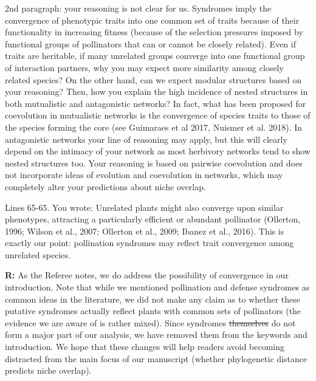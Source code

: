 \documentclass[12pt]{letter}
\newenvironment{refquote}{\bigskip \begin{it}}{\end{it}\smallskip}
\providecommand{\DIFdel}[1]{{\protect\color{red}\sout{#1}}}                      %
\providecommand{\DIFdelbegin}{} %
\providecommand{\DIFdelend}{} %
\newcommand{\DIFscaledelfig}{0.5}
\newlength{\DIFdelgraphicswidth} %
\newlength{\DIFdelgraphicsheight} %
\newcommand{\DIFdelincludegraphics}[2][]{%
\sbox{\DIFdelgraphicsbox}{\DIFOincludegraphics[#1]{#2}}%
\settoboxwidth{\DIFdelgraphicswidth}{\DIFdelgraphicsbox} %
\settoboxtotalheight{\DIFdelgraphicsheight}{\DIFdelgraphicsbox} %
\scalebox{\DIFscaledelfig}{%
\parbox[b]{\DIFdelgraphicswidth}{\usebox{\DIFdelgraphicsbox}\\[-\baselineskip] \rule{\DIFdelgraphicswidth}{0em}}\llap{\resizebox{\DIFdelgraphicswidth}{\DIFdelgraphicsheight}{%
\setlength{\unitlength}{\DIFdelgraphicswidth}%
\begin{picture}(1,1)%
\thicklines\linethickness{2pt} %
{\color[rgb]{1,0,0}\put(0,0){\framebox(1,1){}}}%
{\color[rgb]{1,0,0}\put(0,0){\line( 1,1){1}}}%
{\color[rgb]{1,0,0}\put(0,1){\line(1,-1){1}}}%
\end{picture}%
}\hspace*{3pt}}} %
} %
\DeclareRobustCommand{\DIFdelbegin}{\DIFOdelbegin \let\includegraphics\DIFdelincludegraphics} %
\DeclareRobustCommand{\DIFdelend}{\DIFOaddend \let\includegraphics\DIFOincludegraphics} %
\begin{document}
		\begin{refquote}
			2nd paragraph: your reasoning is not clear for us. Syndromes imply the convergence of phenotypic traits into one common set of traits because of their functionality in increasing fitness (because of the selection pressures imposed by functional groups of pollinators that can or cannot be closely related). Even if traits are heritable, if many unrelated groups converge into one functional group of interaction partners, why you may expect more similarity among closely related species? On the other hand, can we expect modular structures based on your reasoning? Then, how you explain the high incidence of nested structures in both mutualistic and antagonistic networks? In fact, what has been proposed for coevolution in mutualistic networks is the convergence of species traits to those of the species forming the core (see Guimaraes et al 2017, Nuismer et al. 2018). In antagonistic networks your line of reasoning may apply, but this will clearly depend on the intimacy of your network as most herbivory networks tend to show nested structures too. Your reasoning is based on pairwise coevolution and does not incorporate ideas of evolution and coevolution in networks, which may completely alter your predictions about niche overlap.
		\end{refquote}


		\begin{refquote}
			Lines 65-65. You wrote: Unrelated plants might also converge upon similar phenotypes, attracting a particularly efficient or abundant pollinator (Ollerton, 1996; Wilson et al., 2007; Ollerton et al., 2009; Ibanez et al., 2016). This is exactly our point: pollination syndromes may reflect trait convergence among unrelated species.
		\end{refquote}


		\textbf{R:} As the Referee notes, we do address the possibility of convergence in our introduction. Note that while we mentioned pollination and defense syndromes as common ideas in the literature, we did not make any claim as to whether these putative syndromes actually reflect plants with common sets of pollinators (the evidence we are aware of is rather mixed). Since syndromes \DIFdelbegin \DIFdel{themselves }\DIFdelend do not form a major part of our analysis, we have removed them from the keywords and introduction. We hope that these changes will help readers avoid becoming distracted from the main focus of our manuscript (whether phylogenetic distance predicts niche overlap).
\end{document}
